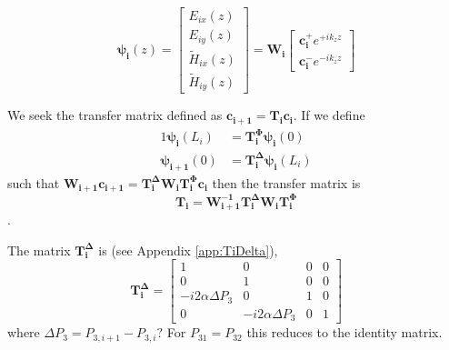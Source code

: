 \documentclass[notitlepage,nofootinbib]{revtex4-1}
\renewcommand{\vec}[1]{\mathbf{#1}}
\begin{document}
\begin{equation}
	\boldsymbol{\psi_i}(z)=
	\begin{bmatrix}
		E_{ix}(z) \\
		E_{iy}(z) \\
		\tilde{H}_{ix}(z) \\
		\tilde{H}_{iy}(z)
	\end{bmatrix}
	=
	\vec{W_i} \begin{bmatrix}
		\vec{c_i^+} e^{+ i k_z z} \\
		\vec{c_i^-} e^{- i k_z z}
	\end{bmatrix}
\end{equation}

We seek the transfer matrix defined as $ \vec{c_{i+1}} = \vec{T_i} \vec{c_i} $. If we define
\begin{alignat}{1}
	\boldsymbol{\psi_i}(L_i) &= \vec{T_i^\Phi} \boldsymbol{\psi_i}(0) \\
	\boldsymbol{\psi_{i+1}}(0) &= \vec{T_i^\Delta} \boldsymbol{\psi_i}(L_i)
\end{alignat}
such that $ \vec{W_{i+1}} \vec{c_{i+1}} = \vec{T_i^\Delta} \vec{W_i} \vec{T_i^\Phi} \vec{c_i}$ then the transfer matrix is
\begin{equation}
	\vec{T_i} = \vec{W_{i+1}^{-1}} \vec{T_i^\Delta} \vec{W_i} \vec{T_i^\Phi}
\end{equation}.

The matrix $ \vec{T_i^\Delta} $ is (see Appendix \ref{app:TiDelta}),
\begin{equation}
	\vec{T_i^\Delta}
	=
	\begin{bmatrix}
		1 & 0 & 0 & 0 \\
		0 & 1 & 0 & 0 \\
		-i2\alpha \Delta P_3 & 0 & 1 & 0 \\
		0 & -i2\alpha \Delta P_3 & 0 & 1
	\end{bmatrix}
\end{equation}
where $ \Delta P_3 = P_{3,i+1} - P_{3,i}? $
For $ P_{31} = P_{32} $ this reduces to the identity matrix.
\end{document}

